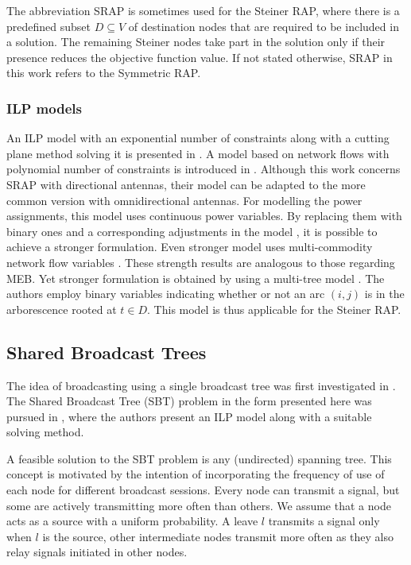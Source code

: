 The abbreviation SRAP is sometimes used for the Steiner RAP, where there is a predefined subset $D\subseteq V$ of destination nodes that are required to be included in a solution.
The remaining Steiner nodes take part in the solution only if their presence reduces the objective function value.
If not stated otherwise, SRAP in this work refers to the Symmetric RAP.

\subsubsection{ILP models}

An ILP model with an exponential number of constraints along with a cutting plane method solving it is presented in \cite{althaus03}.
A model based on network flows with polynomial number of constraints is introduced in \cite{das04}.
Although this work concerns SRAP with directional antennas, their model can be adapted to the more common version with omnidirectional antennas.
For modelling the power assignments, this model uses continuous power variables.
By replacing them with binary ones and a corresponding adjustments in the model \cite{montemanni05, haugland11}, it is possible to achieve a stronger formulation.
Even stronger model uses multi-commodity network flow variables \cite{haugland11}. 
These strength results are analogous to those regarding MEB.
Yet stronger formulation is obtained by using a multi-tree model \cite{haugland11}. 
The authors employ binary variables indicating whether or not an arc $(i,j)$ is in the arborescence rooted at $t\in D$.
This model is thus applicable for the Steiner RAP.

\subsection{Shared Broadcast Trees}\label{sec:sbt}

The idea of broadcasting using a single broadcast tree was first investigated in \cite{papadimitriou06}.
The Shared Broadcast Tree (SBT) problem in the form presented here was pursued in \cite{yuan12}, where the authors present an ILP model along with a suitable solving method.

A feasible solution to the SBT problem is any (undirected) spanning tree.
This concept is motivated by the intention of incorporating the frequency of use of each node for different broadcast sessions.
Every node can transmit a signal, but some are actively transmitting more often than others.
We assume that a node acts as a source with a uniform probability. 
A leave $l$ transmits a signal only when $l$ is the source, other intermediate nodes transmit more often as they also relay signals initiated in other nodes.

